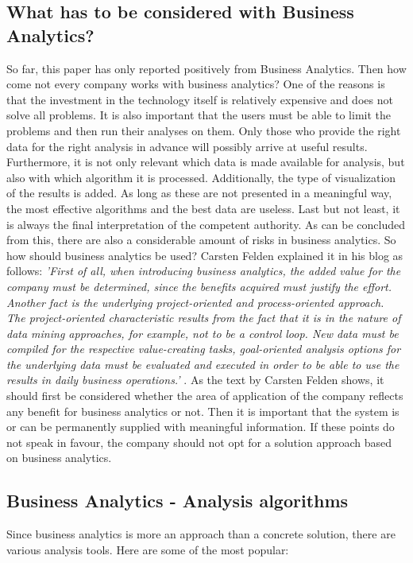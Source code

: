 \documentclass[12pt,twocolumn,twoside]{conference}   %
\begin{document}
\subsection{What has to be considered with Business Analytics?}
So far, this paper has only reported positively from Business Analytics. Then how come not every company works with business analytics? One of the reasons is that the investment in the technology itself is relatively expensive and does not solve all problems. It is also important that the users must be able to limit the problems and then run their analyses on them. Only those who provide the right data for the right analysis in advance will possibly arrive at useful results. Furthermore, it is not only relevant which data is made available for analysis, but also with which algorithm it is processed. Additionally, the type of visualization of the results is added. As long as these are not presented in a meaningful way, the most effective algorithms and the best data are useless. Last but not least, it is always the final interpretation of the competent authority. As can be concluded from this, there are also a considerable amount of risks in business analytics. So how should business analytics be used? Carsten Felden explained it in his blog as follows: \textit{'First of all, when introducing business analytics, the added value for the company must be determined, since the benefits acquired must justify the effort. Another fact is the underlying project-oriented and process-oriented approach. The project-oriented characteristic results from the fact that it is in the nature of data mining approaches, for example, not to be a control loop. New data must be compiled for the respective value-creating tasks, goal-oriented analysis options for the underlying data must be evaluated and executed in order to be able to use the results in daily business operations.'} \cite{4}. As the text by Carsten Felden shows, it should first be considered whether the area of application of the company reflects any benefit for business analytics or not. Then it is important that the system is or can be permanently supplied with meaningful information. If these points do not speak in favour, the company should not opt for a solution approach based on business analytics.

\subsection{Business Analytics - Analysis algorithms}
Since business analytics is more an approach than a concrete solution, there are various analysis tools. Here are some of the most popular:
\end{document}
